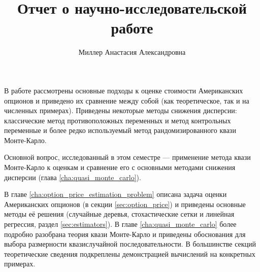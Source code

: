 \documentclass[specialist,
               substylefile = ../spbu.rtx,
               subf,href,colorlinks=true, 12pt]{disser}
\begin{document}
%
%


\title{Отчет о научно-исследовательской работе}


\author{Миллер Анастасия Александровна}


\date{\number\year}

\begin{large}
\maketitle
\end{large}

\tableofcontents

\intro
В работе рассмотрены основные подходы к оценке стоимости Американских опционов и приведено их сравнение между собой (как теоретическое, так и на численных примерах). Приведены некоторые методы снижения дисперсии: классические метод противоположных переменных и метод контрольных переменные и более редко используемый метод рандомизированного квази Монте-Карло.

Основной вопрос, исследованный в этом семестре --- применение метода квази Монте-Карло к оценкам и сравнение его с основными методами снижения дисперсии (глава \ref{cha:quasi_monte_carlo}).

В главе \ref{cha:option_price_estimation_problem} описана задача оценки Американских опционов (в секции \ref{sec:option_price}) и приведены основные методы её решения (случайные деревья, стохастические сетки и линейная регрессия, раздел \ref{sec:estimators}). 
В главе \ref{cha:quasi_monte_carlo} более подробно разобрана теория квази Монте-Карло и приведены обоснования для выбора размерности квазислучайной последовательности. В большинстве секций теоретические сведения подкреплены демонстрацией вычислений на конкретных примерах.
\end{document}
